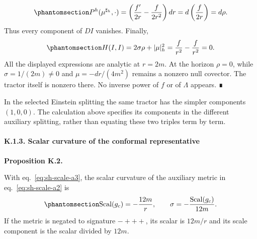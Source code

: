 \documentclass[
  english,
  11pt,
  reqno]{amsart}
\makeatletter
\newcommand{\pandocstatementheading}[1]{%
  \par\addpenalty{\@beginparpenalty}%
  \addvspace{.5\baselineskip plus .2\baselineskip minus .2\baselineskip}%
  {\normalfont\bfseries #1\par}%
  \nobreak\@afterindenttrue\@afterheading
}
\makeatother
\begin{document}
\begin{equation}\protect\phantomsection\label{eq:sh-scale-a14}{
P^h(\mu^{\sharp_h},\cdot)
=\left(\frac{f'}{2r}-\frac f{2r^2}\right)dr
=d\left(\frac f{2r}\right)=d\rho.
}\end{equation} Thus every component of \(DI\) vanishes. Finally,
\begin{equation}\protect\phantomsection\label{eq:sh-scale-a15}{
H(I,I)=2\sigma\rho+|\mu|_h^2
=\frac f{r^2}-\frac f{r^2}=0.
}\end{equation} All the displayed expressions are analytic at \(r=2m\).
At the horizon \(\rho=0\), while \(\sigma=1/(2m)\ne0\) and
\(\mu=-dr/(4m^2)\) remains a nonzero null covector. The tractor itself
is nonzero there. No inverse power of \(f\) or of \(\Lambda\) appears. ∎

In the selected Einstein splitting the same tractor has the simpler
components \((1,0,0)\). The calculation above specifies its components
in the different auxiliary splitting, rather than equating these two
triples term by term.

\protect{}\label{sec:sh-scale-3}

\paragraph{K.1.3. Scalar curvature of the conformal
representative}\label{k.1.3.-scalar-curvature-of-the-conformal-representative}

\pandocstatementheading{\protect{}\label{prop:sh-scale-2}Proposition K.2.}

With eq.~\ref{eq:sh-scale-a3}, the scalar curvature of the auxiliary
metric in eq.~\ref{eq:sh-scale-a2} is
\begin{equation}\protect\phantomsection\label{eq:sh-scale-a16}{
\operatorname{Scal}(g_c)=-\frac{12m}{r},\qquad
\sigma=-\frac{\operatorname{Scal}(g_c)}{12m}.
}\end{equation} If the metric is negated to signature \(-+++\), its
scalar is \(12m/r\) and its scale component is the scalar divided by
\(12m\).
\end{document}
